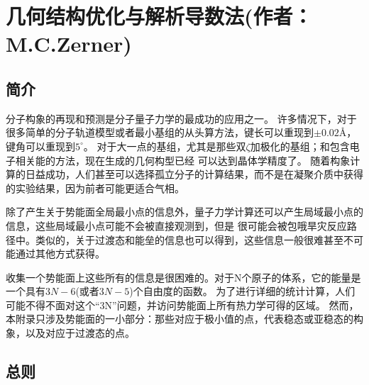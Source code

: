 \chapter{几何结构优化与解析导数法(作者：M.C.Zerner)}
\section{简介}

分子构象的再现和预测是分子量子力学的最成功的应用之一。
许多情况下，对于很多简单的分子轨道模型或者最小基组的从头算方法，键长可以重现到$\pm 0.02$\r A，
键角可以重现到$5^{\circ}$。
对于大一点的基组，尤其是那些双$\zeta$加极化的基组；和包含电子相关能的方法，现在生成的几何构型已经
可以达到晶体学精度了。
随着构象计算的日益成功，人们甚至可以选择孤立分子的计算结果，而不是在凝聚介质中获得的实验结果，因为前者可能更适合气相。

除了产生关于势能面全局最小点的信息外，量子力学计算还可以产生局域最小点的信息，这些局域最小点可能不会被直接观测到，但是
很可能会被包哦旱灾反应路径中。类似的，关于过渡态和能垒的信息也可以得到，这些信息一般很难甚至不可能通过其他方式获得。

收集一个势能面上这些所有的信息是很困难的。对于N个原子的体系，它的能量是一个具有$3N-6$(或者$3N-5$)个自由度的函数。
为了进行详细的统计计算，人们可能不得不面对这个“3N”问题，并访问势能面上所有热力学可得的区域。
然而，本附录只涉及势能面的一小部分：那些对应于极小值的点，代表稳态或亚稳态的构象，以及对应于过渡态的点。
\section{总则}


